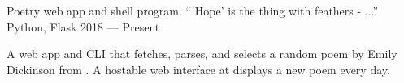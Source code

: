 \showoff
{}
{Poetry web app and shell program. ```Hope' is the thing with feathers - ...''}
{Python, Flask}
{2018 --- Present}

A web app and CLI that fetches, parses, and selects a random poem by Emily Dickinson from . A hostable web interface at  displays a new poem every day.

